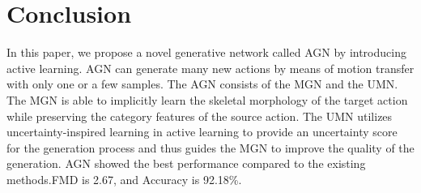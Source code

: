 
\section{Conclusion}

In this paper, we propose a novel generative network called AGN by introducing active learning. 
AGN can generate many new actions by means of motion transfer with only one or a few samples. 
The AGN consists of the MGN and the UMN. 
The MGN is able to implicitly learn the skeletal morphology of the target action while preserving the category features of the source action. 
The UMN utilizes uncertainty-inspired learning in active learning to provide an uncertainty score for the generation process and thus guides the MGN to improve the quality of the generation. 
AGN showed the best performance compared to the existing methods.FMD is 2.67, and Accuracy is 92.18\%. 